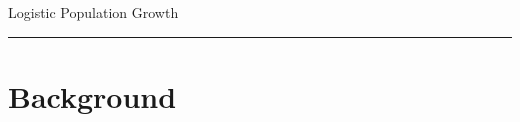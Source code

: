 \documentclass[color=usenames,dvipsnames]{beamer}\usepackage[]{graphicx}\usepackage[]{color}
\begin{document}
\setlength\fboxsep{0pt}




{
\begin{frame}[plain]
  \vspace{-2.35cm}
  \begin{center}
    {\huge Logistic Population Growth } \\
  \end{center}
  \begin{adjustwidth}{-1cm}{-1cm}
    \rule[-7mm]{\paperwidth}{0.5pt}
  \end{adjustwidth}
\end{frame}
}





\section{Background}
\end{document}
